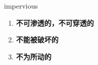 
\begin{frame}
{\huge impervious}
\begin{center}
\begin{enumerate}\Large
  \item \textbf{不可渗透的，不可穿透的}
  \item \textbf{不能被破坏的}
  \item \textbf{不为所动的}
\end{enumerate}
\end{center}
\end{frame}
